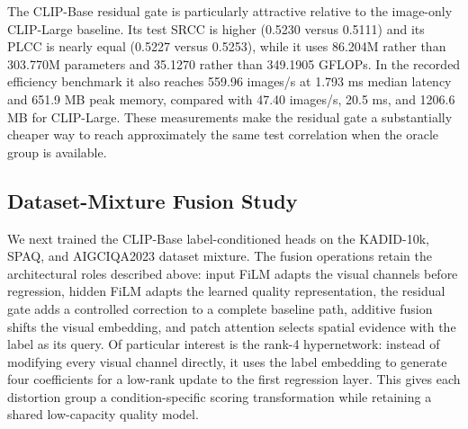 \documentclass{article}
\begin{document}
\begin{table}[htbp]
\centering
\small
\setlength{\tabcolsep}{4pt}
\caption{Best-validation-checkpoint results for oracle dataset labels on KADID-10k. Test values are macro averages over TID2013, CSIQ, CID2013, KonIQ-10k, CLIVE, AGIQA-3K, and UHD-IQA. Parameter counts include the frozen backbone.}
\label{tab:label-kadid}
\end{table}

The CLIP-Base residual gate is particularly attractive relative to the image-only CLIP-Large baseline. Its test SRCC is higher (0.5230 versus 0.5111) and its PLCC is nearly equal (0.5227 versus 0.5253), while it uses 86.204M rather than 303.770M parameters and 35.1270 rather than 349.1905 GFLOPs. In the recorded efficiency benchmark it also reaches 559.96 images/s at 1.793 ms median latency and 651.9 MB peak memory, compared with 47.40 images/s, 20.5 ms, and 1206.6 MB for CLIP-Large. These measurements make the residual gate a substantially cheaper way to reach approximately the same test correlation when the oracle group is available.

\subsection{Dataset-Mixture Fusion Study}

We next trained the CLIP-Base label-conditioned heads on the KADID-10k, SPAQ, and AIGCIQA2023 dataset mixture. The fusion operations retain the architectural roles described above: input FiLM adapts the visual channels before regression, hidden FiLM adapts the learned quality representation, the residual gate adds a controlled correction to a complete baseline path, additive fusion shifts the visual embedding, and patch attention selects spatial evidence with the label as its query. Of particular interest is the rank-4 hypernetwork: instead of modifying every visual channel directly, it uses the label embedding to generate four coefficients for a low-rank update to the first regression layer. This gives each distortion group a condition-specific scoring transformation while retaining a shared low-capacity quality model.
\end{document}
